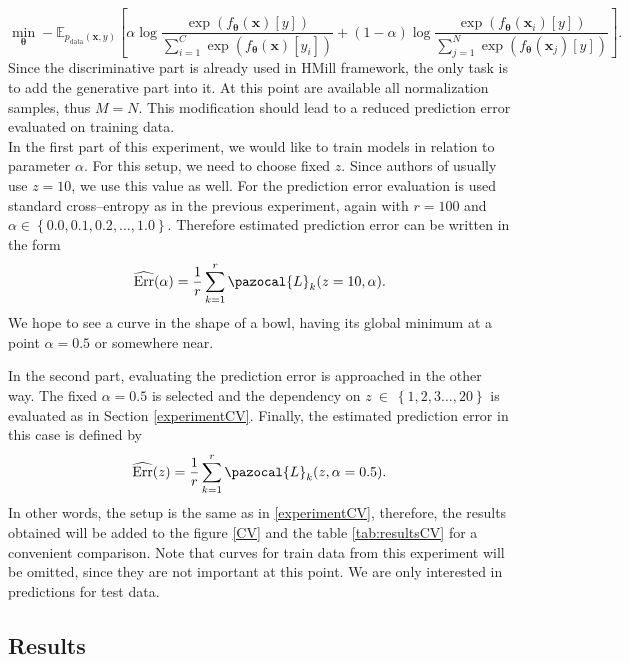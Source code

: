 \begin{equation}
	\min_{\boldsymbol{\theta}}- \mathbb{E}_{p_{\mathrm{data}}(\boldsymbol{x},y)}\left[\alpha\log \frac{\exp\left({f_{\boldsymbol{\theta}}\left(\boldsymbol{x}\right)[y]}\right)}{\sum_{i=1}^C\exp\left({f_{\boldsymbol{\theta}}\left(\boldsymbol{x}\right)[y_i]}\right)}+ \left(1-\alpha\right)\log \frac{\exp\left({f_{\boldsymbol{\theta}}\left(\boldsymbol{x}_i\right)[y]}\right)}{\sum_{j=1}^N\exp\left({f_{\boldsymbol{\theta}}\left(\boldsymbol{x}_j\right)[y]}\right)} \right].
	\end{equation}
Since the discriminative part is already used in HMill framework, the only task is to add the generative part into it. At this point are available all normalization samples, thus $M=N$. This modification should lead to a reduced prediction error evaluated on training data.\\
In the first part of this experiment, we would like to train models in relation to parameter $\alpha$. For this setup, we need to choose fixed $z$. Since authors of \cite{mandlik} usually use $z=10$, we use this value as well. For the prediction error evaluation is used standard cross--entropy as in the previous experiment, again with $r=100$ and $\alpha \in \left\{0.0, 0.1, 0.2,\dots,1.0\right\}$. Therefore estimated prediction error can be written in the form
\begin{equation}
	\widehat{\mathrm{Err}}(\alpha) = \frac{1}{r}\sum_{k=1}^r \pazocal{L}_k(z=10, \alpha).
\end{equation}
We hope to see a curve in the shape of a bowl, having its global minimum at a point $\alpha=0.5$ or somewhere near.

In the second part, evaluating the prediction error is approached in the other way. The fixed $\alpha = 0.5$ is selected and the dependency on $z~\in~\left\{1,2,3\dots,20 \right\}$ is evaluated as in Section \ref{experimentCV}. Finally, the estimated prediction error in this case is defined by
\begin{equation}
	\widehat{\mathrm{Err}}(z) = \frac{1}{r}\sum_{k=1}^r \pazocal{L}_k(z, \alpha =0.5).
\end{equation}
In other words, the setup is the same as in \ref{experimentCV}, therefore, the results obtained will be added to the figure \ref{CV} and the table \ref{tab:resultsCV} for a convenient comparison. Note that curves for train data from this experiment will be omitted, since they are not important at this point. We are only interested in predictions for test data.  
\clearpage
\subsection{Results}



